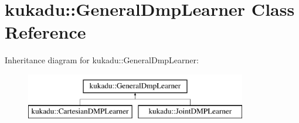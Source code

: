 \hypertarget{classkukadu_1_1GeneralDmpLearner}{\section{kukadu\-:\-:General\-Dmp\-Learner Class Reference}
\label{classkukadu_1_1GeneralDmpLearner}
}
Inheritance diagram for kukadu\-:\-:General\-Dmp\-Learner\-:\begin{figure}[H]
\begin{center}
\leavevmode
\includegraphics[height=2.000000cm]{classkukadu_1_1GeneralDmpLearner}
\end{center}
\end{figure}

